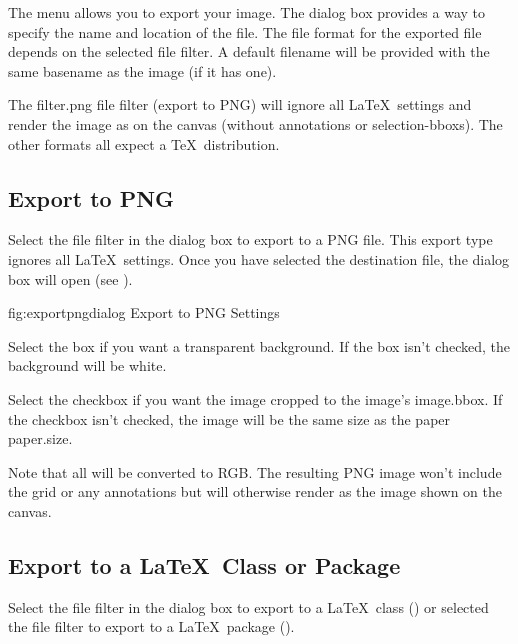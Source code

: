 The  menu allows you to export your image. The
 dialog box provides a way to specify the name
and location of the file.  The file format for the exported file
depends on the selected file filter.  A default filename will be
provided with the same basename as the image (if it has one).

The \gls{filter.png} file filter (export to PNG) will ignore all
\LaTeX\ settings and render the image as 
on the \gls{canvas} (without annotations or \glspl{selection-bbox}).
The other formats all expect a \TeX\ distribution.

\subsection{Export to PNG}\label{sec:exportpng}

Select the  file filter in the
 dialog box to export to a PNG file. This export type
ignores all \LaTeX\ settings. Once you have selected the destination
 file, the 
dialog box will open (see ).

\FloatFig
  {fig:exportpngdialog}
  {}
  {Export to PNG Settings}

Select the  box if you want a \gls{transparent}
background. If the box isn't checked, the background will be white.

Select the  checkbox if you want the image cropped
to the image's \gls{image.bbox}. If the checkbox isn't checked, the image
will be the same size as the paper \gls{paper.size}. 

Note that all  will be converted to RGB.
The resulting PNG image won't include the grid or any annotations
but will otherwise render as the image shown on the \gls{canvas}.

\subsection{Export to a \LaTeX\ Class or Package}\label{sec:exportsty}

Select the  file filter in the
 dialog box to export to a \LaTeX\ class
() or selected the 
file filter to export to a \LaTeX\ package ().


